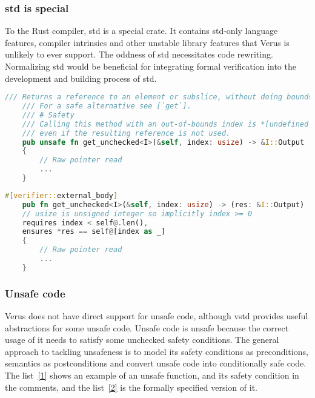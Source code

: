 \documentclass[conference]{IEEEtran}
\begin{document}
\subsubsection{std is special}
To the Rust compiler, std is a special crate. It contains std-only language features, compiler intrinsics and other unstable library features that Verus is unlikely to ever support. The oddness of std necessitates code rewriting. Normalizing std would be beneficial for integrating formal verification into the development and building process of std.     

\begin{lstlisting}[float,language=Rust,style=colouredRust, caption={a simplified example of the safety condition of an unsafe public function in std}, label = {1}]
     /// Returns a reference to an element or subslice, without doing bounds checking.
    /// For a safe alternative see [`get`].
    /// # Safety
    /// Calling this method with an out-of-bounds index is *[undefined behavior]*
    /// even if the resulting reference is not used.
    pub unsafe fn get_unchecked<I>(&self, index: usize) -> &I::Output
    {
        // Raw pointer read  
        ...
    }
\end{lstlisting}

\begin{lstlisting}[float,language=Rust,style=colouredRust, caption={a simplified example of converting an unsafe function into a conditionally safe function. We do not need the \texttt{unsafe} keyword in the function signature if the caller is also verified. The \texttt{external\_body} annotation makes the verifier ignore the function body. The safety condition in the comment is also replaced with a precondition. The \texttt{@} operator is a syntactic sugar that returns the abstract representation of the operand.}, label = {2}]
    #[verifier::external_body]
    pub fn get_unchecked<I>(&self, index: usize) -> (res: &I::Output)
    // usize is unsigned integer so implicitly index >= 0
    requires index < self@.len(),
    ensures *res == self@[index as _]
    {
        // Raw pointer read  
        ...
    }
\end{lstlisting}
\subsubsection{Unsafe code}
Verus does not have direct support for unsafe code, although vstd provides useful abstractions for some unsafe code. Unsafe code is unsafe because the correct usage of it needs to satisfy some unchecked safety conditions. The general approach to tackling unsafeness is to model its safety conditions as preconditions, semantics as postconditions and convert unsafe code into conditionally safe code. The list~\ref{1} shows an example of an unsafe function, and its safety condition in the comments, and the list~\ref{2} is the formally specified version of it.   
\end{document}
